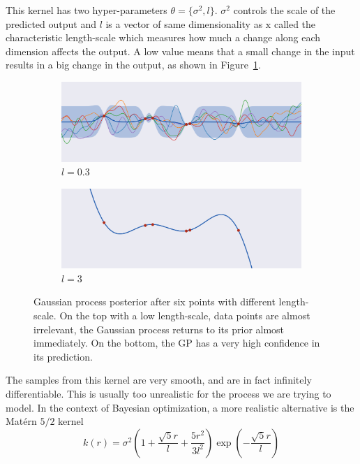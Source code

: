 This kernel has two hyper-parameters $\theta = \{ \sigma^2 , l \}$. $\sigma^2$ controls the scale of the predicted output and $l$ is a vector of same dimensionality as $\mathrm{x}$ called the characteristic length-scale which measures how much a change along each dimension affects the output. A low value means that a small change in the input results in a big change in the output, as shown in Figure~\ref{fig:gp_lengthscale}.

\begin{figure}[htb]
    \centering
    \begin{subfigure}[b]{\textwidth}
        \includegraphics[width=\textwidth]{img_hyperopt/gp_lengthscale_small}
        \caption{$l = 0.3$}
    \end{subfigure}

    \begin{subfigure}[b]{\textwidth}
        \includegraphics[width=\textwidth]{img_hyperopt/gp_lengthscale_big}
        \caption{$l = 3$}
    \end{subfigure}
    \caption{Gaussian process posterior after six points with different length-scale. On the top with a low length-scale, data points are almost irrelevant, the Gaussian process returns to its prior almost immediately. On the bottom, the GP has a very high confidence in its prediction.}
    \label{fig:gp_lengthscale}
\end{figure}

The samples from this kernel are very smooth, and are in fact infinitely differentiable. This is usually too unrealistic for the process we are trying to model. In the context of Bayesian optimization, a more realistic alternative is the Matérn $5/2$ kernel
\begin{equation}
    k(r) = \sigma^2 \left( 1 + \frac{\sqrt{5}r}{l} + \frac{5r^2}{3l^2} \right) \exp \left( - \frac{\sqrt{5}r}{l}\right)
\end{equation}

